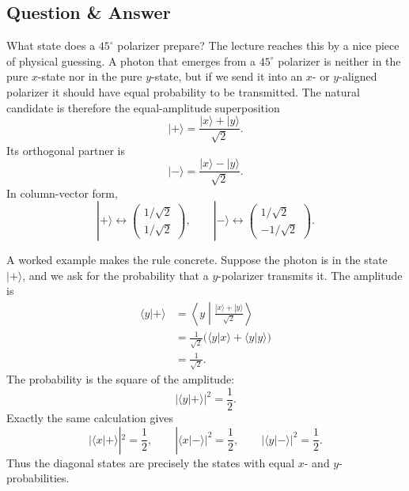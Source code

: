 \subsection{Question \& Answer}

What state does a \(45^\circ\) polarizer prepare? The lecture reaches this by a nice piece of physical guessing. A photon that emerges from a \(45^\circ\) polarizer is neither in the pure \(x\)-state nor in the pure \(y\)-state, but if we send it into an \(x\)- or \(y\)-aligned polarizer it should have equal probability to be transmitted. The natural candidate is therefore the equal-amplitude superposition
\begin{equation}
|+\rangle=\frac{|x\rangle+|y\rangle}{\sqrt{2}}.
\end{equation}
Its orthogonal partner is
\begin{equation}
|-\rangle=\frac{|x\rangle-|y\rangle}{\sqrt{2}}.
\end{equation}
In column-vector form,
\begin{equation}
|+\rangle \leftrightarrow
\begin{pmatrix}
1/\sqrt{2}\\
1/\sqrt{2}
\end{pmatrix},
\qquad
|-\rangle \leftrightarrow
\begin{pmatrix}
1/\sqrt{2}\\
-1/\sqrt{2}
\end{pmatrix}.
\end{equation}

A worked example makes the rule concrete. Suppose the photon is in the state \(|+\rangle\), and we ask for the probability that a \(y\)-polarizer transmits it. The amplitude is
\begin{align}
\langle y|+\rangle
&=\left\langle y\middle|\frac{|x\rangle+|y\rangle}{\sqrt{2}}\right\rangle \\
&=\frac{1}{\sqrt{2}}\bigl(\langle y|x\rangle+\langle y|y\rangle\bigr) \\
&=\frac{1}{\sqrt{2}}.
\end{align}
The probability is the square of the amplitude:
\begin{equation}
|\langle y|+\rangle|^2=\frac{1}{2}.
\end{equation}
Exactly the same calculation gives
\begin{equation}
|\langle x|+\rangle|^2=\frac{1}{2},
\qquad
|\langle x|-\rangle|^2=\frac{1}{2},
\qquad
|\langle y|-\rangle|^2=\frac{1}{2}.
\end{equation}
Thus the diagonal states are precisely the states with equal \(x\)- and \(y\)-probabilities.

